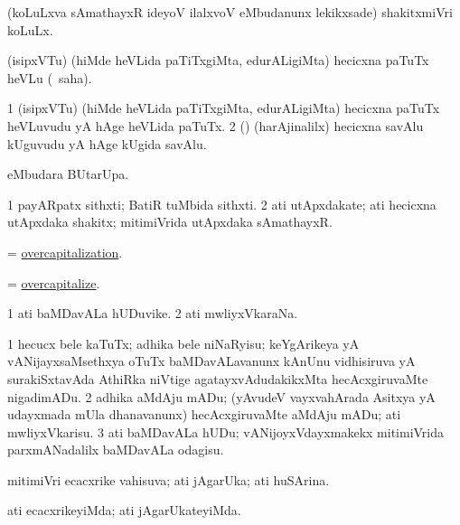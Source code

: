 \noindent
\gl{\akirx}
\bmng
(koLuLxva sAmathayxR ideyoV ilalxvoV eMbudanunx lekikxsade) shakitxmiVri koLuLx. 
\emng
\eentry

\bentry
{}
\gl{\sakirx}
\bmng
(isipxVTu) (hiMde heVLida paTiTxgiMta, edurALigiMta) hecicxna paTuTx heVLu (\akirx\ saha). 
\emng
\eentry

\bentry
{}
\gl{\nA}
\bmng
\bnum
\num{1} (isipxVTu) (hiMde heVLida paTiTxgiMta, edurALigiMta) hecicxna paTuTx heVLuvudu yA hAge heVLida paTuTx. 
\num{2} (\birx) (harAjinalilx) hecicxna savAlu kUguvudu yA hAge kUgida savAlu. 
\enum
\emng
\eentry

\bentry
{}
\gl{\kirx}
\bmng
{} eMbudara BUtarUpa. 
\emng
\eentry

\bentry
{}
\gl{\nA}
\bmng
\bnum
\num{1} payARpatx sithxti; BatiR tuMbida sithxti. 
\num{2} ati utApxdakate; ati hecicxna utApxdaka shakitx; mitimiVrida utApxdaka sAmathayxR. 
\enum
\emng
\eentry

\bentry
{}
\gl{}
\bmng
= \hyperlink{overcapitalization}{overcapitalization}. 
\emng
\eentry

\bentry
{}
\gl{\sakirx}
\bmng
= \hyperlink{overcapitalize}{overcapitalize}. 
\emng
\eentry

\bentry
{}
\gl{\nA}
\bmng
\bnum
\num{1} ati baMDavALa hUDuvike. 
\num{2} ati mwliyxVkaraNa. 
\enum
\emng
\eentry

\bentry
{}
\gl{\sakirx}
\bmng
\bnum
\num{1} hecucx bele kaTuTx; adhika bele niNaRyisu; keYgArikeya yA vANijayxsaMsethxya oTuTx baMDavALavanunx kAnUnu vidhisiruva yA surakiSxtavAda AthiRka niVtige agatayxvAdudakikxMta hecAcxgiruvaMte nigadimADu. 
\num{2} adhika aMdAju mADu; (yAvudeV vayxvahArada Asitxya yA udayxmada mUla dhanavanunx) hecAcxgiruvaMte aMdAju mADu; ati mwliyxVkarisu. 
\num{3} ati baMDavALa hUDu; vANijoyxVdayxmakekx mitimiVrida parxmANadalilx baMDavALa odagisu. 
\enum
\emng
\eentry

\bentry
{}
\gl{\gu}
\bmng
mitimiVri ecacxrike vahisuva; ati jAgarUka; ati huSArina. 
\emng
\eentry

\bentry
{}
\gl{\kirxvi}
\bmng
ati ecacxrikeyiMda; ati jAgarUkateyiMda. 
\emng
\eentry

